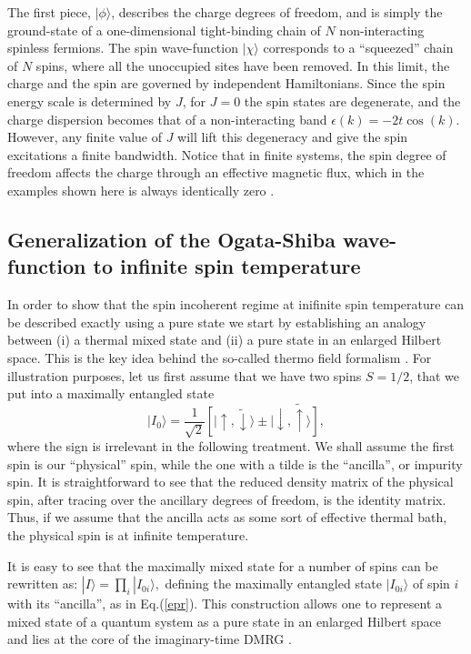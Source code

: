 \documentclass[article,11pt]{revtex4}
\begin{document}
The first piece, $|\phi\rangle$, describes the charge degrees of freedom, and is
simply the ground-state of a one-dimensional tight-binding chain of $N$ non-interacting spinless fermions. The spin wave-function $|\chi\rangle$ corresponds to a ``squeezed'' chain of $N$ spins, where all the unoccupied sites have been removed.
In this limit, 
the charge and the spin are governed by independent Hamiltonians.
Since the spin energy scale is determined by $J$, for $J=0$ the spin states are degenerate, and the charge dispersion becomes that of a non-interacting band $\epsilon(k)=-2t\cos(k)$. However, any finite value of $J$ will lift this degeneracy and give the spin excitations a finite bandwidth. Notice that in finite systems, the spin degree of freedom affects the charge through an effective magnetic flux, which in the examples shown here is always identically zero \cite{Caspers1989,Penc1997,Rincon2009}.

\subsection {Generalization of the Ogata-Shiba wave-function to infinite spin temperature}

In order to show that the spin incoherent regime at inifinite spin temperature can be described exactly using a pure state we start by establishing an analogy between (i) a thermal mixed state and (ii) a pure state in an enlarged Hilbert space.  This is the key idea behind the so-called thermo field formalism \cite{Takahashi1975}. 
For illustration purposes, let us first assume that we have two spins $S=1/2$, that we put  into
a maximally entangled state
\begin{equation}
|I_0\rangle = \frac{1}{\sqrt{2}}
\left[|\uparrow,\tilde\downarrow\rangle \pm |\downarrow,\tilde\uparrow\rangle\right],
\label{epr}
\end{equation}
where the sign is irrelevant in the following treatment. We shall assume the first spin is our ``physical'' spin, while the one with a tilde is the ``ancilla'', or impurity spin. It is straightforward to see that the reduced density matrix of the physical spin, after tracing over the ancillary degrees of freedom, is the identity matrix.  Thus, if we assume that the ancilla acts as some sort of effective thermal bath, the physical spin is at infinite temperature.

It is easy to see that the maximally mixed state for a number of spins can be rewritten as:
$|I \rangle = \prod_i |I_{0i}\rangle,$
defining the maximally entangled state $|I_{0i}\rangle$ of spin $i$ with
its ``ancilla'', as in Eq.(\ref{epr}).
This construction allows one to represent a mixed state of a quantum system as a pure state in an enlarged Hilbert space
and lies at the core of the imaginary-time DMRG \cite{Feiguin2005a}.
\end{document}
